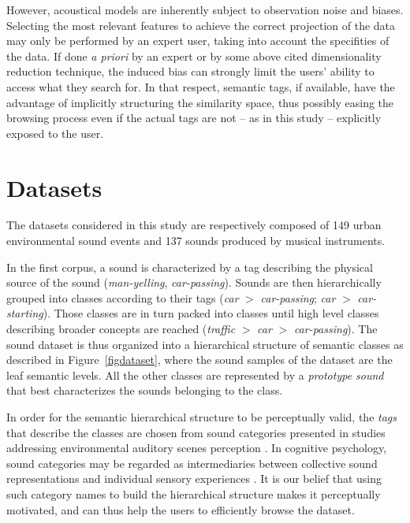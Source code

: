 \documentclass{aes2e}
\begin{document}
However, acoustical models are inherently subject to observation noise and biases. Selecting the most relevant features to achieve the correct projection of the data may only be performed by an expert user, taking into account the specifities of the data. If done \textit{a priori} by an expert or by some above cited dimensionality reduction technique, the induced bias can strongly limit the users' ability to access what they search for. In that respect, semantic tags, if available, have the advantage of implicitly structuring the similarity space, thus possibly easing the browsing process even if the actual tags are not -- as in this study -- explicitly exposed to the user.

\section{Datasets} \label{dataset}



The datasets considered in this study are respectively composed of 149 urban environmental sound events and 137 sounds produced by musical instruments. 

In the first corpus, a sound is characterized by a tag describing the physical source of the sound (\textit{man-yelling}, \textit{car-passing}). Sounds are then hierarchically grouped into classes according to their tags (\textit{car} $>$ \textit{car-passing}; \textit{car} $>$ \textit{car-starting}). Those classes are in turn packed into classes until high level classes describing broader concepts are reached (\textit{traffic} $>$ \textit{car} $>$ \textit{car-passing}). The sound dataset is thus organized into a hierarchical structure of semantic classes as described in Figure~\ref{figdataset}, where the sound samples of the dataset are the leaf semantic levels. All the other classes are represented by a \textit{prototype sound} that best characterizes the sounds belonging to the class. 

In order for the semantic hierarchical structure to be perceptually valid, the \textit{tags} that describe the classes  are chosen from sound categories presented in studies addressing environmental auditory scenes perception \cite{niessen2010categories, brown2011towards, dubois2006cognitive}. In cognitive psychology, sound categories may be regarded as intermediaries between collective sound representations and individual sensory experiences \cite{dubois2006cognitive}. It is our belief that using such category names to build the hierarchical structure makes it perceptually motivated, and can thus help the users to efficiently browse the dataset.
\end{document}
